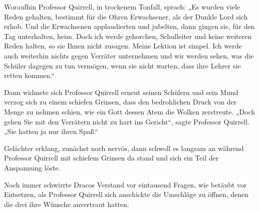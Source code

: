 Woraufhin Professor Quirrell, in trockenem Tonfall, sprach: „Es wurden viele Reden gehalten, bestimmt für die Ohren Erwachsener, als der Dunkle Lord sich erhob. Und die Erwachsenen applaudierten und jubelten, dann gingen sie, für den Tag unterhalten, heim. Doch ich werde gehorchen, Schulleiter und keine weiteren Reden halten, so sie Ihnen nicht zusagen. Meine Lektion ist simpel. Ich werde auch weiterhin nichts gegen Verräter unternehmen und wir werden sehen, was die Schüler dagegen zu tun vermögen, wenn sie nicht warten, dass ihre Lehrer sie retten kommen.“

Dann widmete sich Professor Quirrell erneut seinen Schülern und sein Mund verzog sich zu einem schiefen Grinsen, dass den bedrohlichen Druck von der Menge zu nehmen schien, wie ein Gott dessen Atem die Wolken zerstreute. „Doch gehen Sie mit den Verrätern nicht zu hart ins Gericht“, sagte Professor Quirrell. „Sie hatten ja nur ihren Spaß.“

Gelächter erklang, zunächst noch nervös, dann schwoll es langsam an während Professor Quirrell mit schiefem Grinsen da stand und sich ein Teil der Anspannung löste.

\later

Noch immer schwirrte Dracos Verstand vor eintausend Fragen, wie betäubt vor Entsetzen, als Professor Quirrell sich anschickte die Umschläge zu öffnen, denen die drei ihre Wünsche anvertraut hatten.

